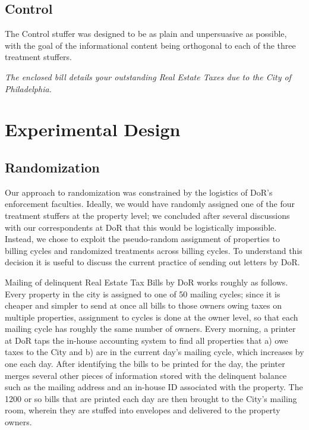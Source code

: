\documentclass[12pt,titlepage]{article}
\begin{document}
\subsection{Control}

The Control stuffer was designed to be as plain and unpersuasive as possible, 
with the goal of the informational content being orthogonal to each of the
three treatment stuffers. 

{\it The enclosed bill details your outstanding 
Real Estate Taxes due to the City of Philadelphia.}

\section{Experimental Design}

\subsection{Randomization}

Our approach to randomization was constrained by the logistics of
DoR's enforcement faculties. Ideally, we would have randomly assigned
one of the four treatment stuffers at the property level; we concluded
after several discussions with our correspondents at DoR that this
would be logistically impossible. Instead, we chose to exploit the
pseudo-random assignment of properties to billing cycles and randomized
treatments across billing cycles.  To understand this decision it is
useful to discuss the current practice of sending out letters by DoR.

Mailing of delinquent Real Estate Tax Bills by DoR works roughly as
follows.  Every property in the city is assigned to one of 50 mailing
cycles; since it is cheaper and simpler to send at once all bills to
those owners owing taxes on multiple properties, assignment to cycles
is done at the owner level, so that each mailing cycle has roughly the
same number of owners.  Every morning, a printer at DoR taps the
in-house accounting system to find all properties that a) owe taxes to
the City and b) are in the current day's mailing cycle, which
increases by one each day. After identifying the bills to be
printed for the day, the printer merges several other pieces of
information stored with the delinquent balance such as the mailing
address and an in-house ID associated with the property. The 1200 or
so bills that are printed each day are then brought to the City's
mailing room, wherein they are stuffed into envelopes and delivered to
the property owners.
\end{document}
